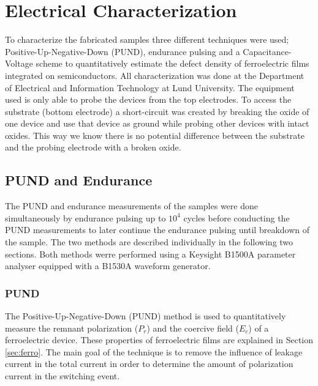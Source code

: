 \documentclass[11pt,twoside,final]{eitExjobb}  %
\begin{document}
\chapter{Electrical Characterization}\label{ch:char}

To characterize the fabricated samples three different techniques were used;
Positive-Up-Negative-Down (PUND), endurance pulsing and a Capacitance-Voltage scheme to
quantitatively estimate the defect density of ferroelectric films integrated on
semiconductors. \cite{persson2020method} All characterization was done at the
Department of Electrical and Information Technology at Lund University. The
equipment used is only able to probe the devices from the top electrodes. To
access the  substrate (bottom electrode) a short-circuit was created
by breaking the oxide of one device and use that device as ground while probing
other devices with intact oxides. This way we know there is no potential
difference between the  substrate and the probing electrode with a
broken oxide.

\section{PUND and Endurance}\label{sec:PandE}
The PUND and endurance measurements of the samples were done simultaneously by
endurance pulsing up to $10^4$ cycles before conducting the PUND measurements to
later continue the endurance pulsing until breakdown of the sample. The two
methods are described individually in the following two sections. Both methods
werre performed using a Keysight B1500A parameter analyser equipped with a
B1530A waveform generator.

\subsection{PUND}\label{sec:PUND}
The Positive-Up-Negative-Down (PUND) method is used to quantitatively measure
the remnant polarization ($P_r$) and the coercive field ($E_c$) of a
ferroelectric device. These properties of ferroelectric films are explained in
Section \ref{sec:ferro}. The main goal of the technique is to remove the
influence of leakage current in the total current in order to determine the
amount of polarization current in the switching event.
\end{document}
